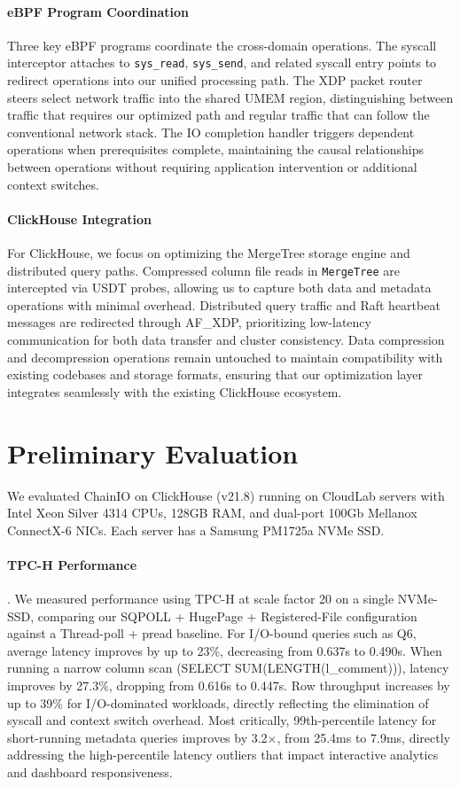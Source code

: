 \documentclass[sigconf,10pt]{acmart}
\newcommand{\sys}{ChainIO\xspace}
\begin{document}
\paragraph{eBPF Program Coordination}
Three key eBPF programs coordinate the cross-domain operations. The syscall interceptor attaches to \texttt{sys\_read}, \texttt{sys\_send}, and related syscall entry points to redirect operations into our unified processing path. The XDP packet router steers select network traffic into the shared UMEM region, distinguishing between traffic that requires our optimized path and regular traffic that can follow the conventional network stack. The IO completion handler triggers dependent operations when prerequisites complete, maintaining the causal relationships between operations without requiring application intervention or additional context switches.

\paragraph{ClickHouse Integration}
For ClickHouse, we focus on optimizing the MergeTree storage engine and distributed query paths. Compressed column file reads in \texttt{MergeTree} are intercepted via USDT probes, allowing us to capture both data and metadata operations with minimal overhead. Distributed query traffic and Raft heartbeat messages are redirected through AF\_XDP, prioritizing low-latency communication for both data transfer and cluster consistency. Data compression and decompression operations remain untouched to maintain compatibility with existing codebases and storage formats, ensuring that our optimization layer integrates seamlessly with the existing ClickHouse ecosystem.

\section{Preliminary Evaluation}\label{sec:evaluation}

We evaluated \sys on ClickHouse (v21.8) running on CloudLab servers with Intel Xeon Silver 4314 CPUs, 128GB RAM, and dual-port 100Gb Mellanox ConnectX-6 NICs. Each server has a Samsung PM1725a NVMe SSD.

\paragraph{TPC-H Performance}. We measured performance using TPC-H at scale factor 20 on a single NVMe-SSD, comparing our SQPOLL + HugePage + Registered-File configuration against a Thread-poll + pread baseline. For I/O-bound queries such as Q6, average latency improves by up to 23\%, decreasing from 0.637s to 0.490s. When running a narrow column scan (SELECT SUM(LENGTH(l\_comment))), latency improves by 27.3\%, dropping from 0.616s to 0.447s. Row throughput increases by up to 39\% for I/O-dominated workloads, directly reflecting the elimination of syscall and context switch overhead. Most critically, 99th-percentile latency for short-running metadata queries improves by 3.2×, from 25.4ms to 7.9ms, directly addressing the high-percentile latency outliers that impact interactive analytics and dashboard responsiveness.
\end{document}
